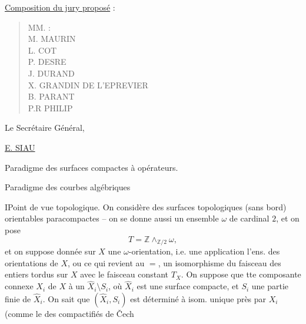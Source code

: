 \uline{Composition du jury proposé} :
\begin{quote}MM. :\\M. MAURIN\\L. COT\\P. DESRE\\J. DURAND\\X. GRANDIN DE L'EPREVIER\\B. PARANT\\P.R PHILIP\end{quote}
\begin{flushright}Le Secrétaire Général,\end{flushright}
\begin{flushright}\uline{E. SIAU}\end{flushright}

Paradigme 
des surfaces compactes
à opérateurs.

Paradigme des courbes algébriques

I\quad Point de vue topologique.
On considère des surfaces topologiques (sans bord)
orientables paracompactes  -- on se donne
 aussi un ensemble $\omega$ de cardinal $2$,
et on pose
\[T=\mathbb Z\wedge_{\mathbb Z/2}\omega,\]
et on suppose donnée sur $X$ une $\omega$-orientation,
i.e. une application
l'ens. des orientations de $X$, ou ce
qui revient au $=$, un isomorphisme
du faisceau des entiers tordus sur $X$
avec le faisceau constant $T_X$.
On suppose que tte composante connexe
$X_i$ de $X$   à un
$\widehat X_i\setminus S_i$, où $\widehat X_i$ est une surface
compacte, et $S_i$ une partie finie de
$\widehat X_i$. On sait que $(\widehat X_i,S_i)$ est déterminé
à isom. unique près par $X_i$
(comme le  des compactifiés de Čech

